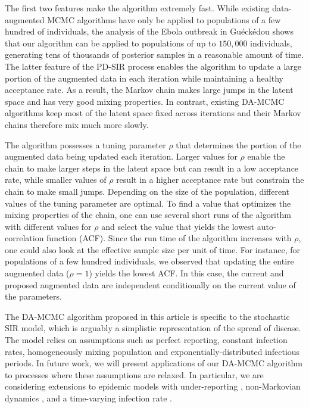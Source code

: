 \documentclass[11pt]{article}
\begin{document}
	The first two features make the algorithm extremely fast. While existing data-augmented MCMC algorithms have only be applied to populations of a few hundred of individuals, the analysis of the Ebola outbreak in Gu\'eck\'edou shows that our algorithm can be applied to populations of up to $150,000$ individuals, generating tens of thousands of posterior samples in a reasonable amount of time.	
	The latter feature of the PD-SIR process enables the algorithm to update a large portion of the augmented data in each iteration while maintaining a healthy acceptance rate. As a result, the Markov chain makes large jumps in the latent space and has very good mixing properties. In contrast, existing DA-MCMC algorithms keep most of the latent space fixed across iterations \cite{Gibson.1998, ONeill.1999, Fintzi.2017} and their Markov chains therefore mix much more slowly.
	
	The algorithm possesses a tuning parameter $\rho$ that determines the portion of the augmented data being updated each iteration. Larger values for $\rho$ enable the chain to make larger steps in the latent space but can result in a low acceptance rate, while smaller values of $\rho$ result in a higher acceptance rate but constrain the chain to make small jumps. Depending on the size of the population, different values of the tuning parameter are optimal. To find a value that optimizes the mixing properties of the chain, one can use several short runs of the algorithm with different values for $\rho$ and select the value that yields the lowest auto-correlation function (ACF). Since the run time of the algorithm increases with $\rho$, one could also look at the effective sample size per unit of time. For instance, for populations of a few hundred individuals, we observed that updating the entire augmented data ($\rho=1$) yields the lowest ACF. In this case, the current and proposed augmented data are independent conditionally on the current value of the parameters.
	
	The DA-MCMC algorithm proposed in this article is specific to the stochastic SIR model, which is arguably a simplistic representation of the spread of disease. The model relies on assumptions such as perfect reporting, constant infection rates, homogeneously mixing population and exponentially-distributed infectious periods. In future work, we will present applications of our DA-MCMC algorithm to processes where these assumptions are relaxed. In particular, we are considering extensions to epidemic models with under-reporting \cite{Fintzi.2017}, non-Markovian dynamics \cite{Streftaris.2002}, and a time-varying infection rate \cite{Kypraios.2018}.
	
\end{document}
